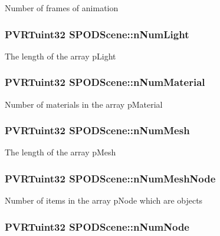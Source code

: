 Number of frames of animation \hypertarget{struct_s_p_o_d_scene_a1e96379dedf00f0f40e228bfb6134ed9}{
\subsubsection[{n\+Num\+Light}]{\setlength{\rightskip}{0pt plus 5cm}P\+V\+R\+Tuint32 S\+P\+O\+D\+Scene\+::n\+Num\+Light}}\label{struct_s_p_o_d_scene_a1e96379dedf00f0f40e228bfb6134ed9}
The length of the array p\+Light \hypertarget{struct_s_p_o_d_scene_a2c75dec98cbb3668f8babe85a6896770}{
\subsubsection[{n\+Num\+Material}]{\setlength{\rightskip}{0pt plus 5cm}P\+V\+R\+Tuint32 S\+P\+O\+D\+Scene\+::n\+Num\+Material}}\label{struct_s_p_o_d_scene_a2c75dec98cbb3668f8babe85a6896770}
Number of materials in the array p\+Material \hypertarget{struct_s_p_o_d_scene_afdcb771c7abf69fede83d561df34b1a7}{
\subsubsection[{n\+Num\+Mesh}]{\setlength{\rightskip}{0pt plus 5cm}P\+V\+R\+Tuint32 S\+P\+O\+D\+Scene\+::n\+Num\+Mesh}}\label{struct_s_p_o_d_scene_afdcb771c7abf69fede83d561df34b1a7}
The length of the array p\+Mesh \hypertarget{struct_s_p_o_d_scene_a777c67f414705f007f4cf0407b70cb55}{
\subsubsection[{n\+Num\+Mesh\+Node}]{\setlength{\rightskip}{0pt plus 5cm}P\+V\+R\+Tuint32 S\+P\+O\+D\+Scene\+::n\+Num\+Mesh\+Node}}\label{struct_s_p_o_d_scene_a777c67f414705f007f4cf0407b70cb55}
Number of items in the array p\+Node which are objects \hypertarget{struct_s_p_o_d_scene_a983e12238e7b38a01b917a4c17e01d98}{
\subsubsection[{n\+Num\+Node}]{\setlength{\rightskip}{0pt plus 5cm}P\+V\+R\+Tuint32 S\+P\+O\+D\+Scene\+::n\+Num\+Node}}\label{struct_s_p_o_d_scene_a983e12238e7b38a01b917a4c17e01d98}
